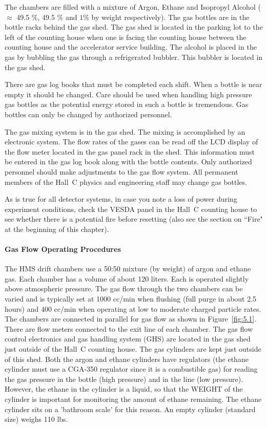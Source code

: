 The chambers are filled with a mixture of Argon, Ethane and Isopropyl Alcohol
($\approx$ 49.5 $\%$, 49.5 $\%$  and $1\%$ by weight respectively).
The gas bottles are in the bottle racks behind the gas shed. The gas shed
is located in the parking lot to the left of the counting house when one is facing the counting
house between the counting house and the accelerator
service building.  The alcohol is placed in the gas
by bubbling the gas through a refrigerated bubbler. This bubbler is
located in the gas shed.

There are gas log books that must be completed each shift.
When a bottle is near empty it should be changed.
Care should be used when handling high pressure gas bottles as the
potential energy stored in such a bottle is tremendous.
Gas bottles can only be changed by authorized personnel.

The gas mixing system is in the gas shed. The mixing is accomplished
by an electronic system. The flow rates of the gases can be read off the
LCD display of the flow meter located in the gas panel rack in the shed.
This information must be entered in the gas log book along with the bottle contents.
Only authorized personnel should make adjustments to the gas flow system.
All permanent members
of the Hall~C physics and engineering staff may change gas bottles.

As is true for all detector systems, in case you note a loss of power
during experiment conditions, check the VESDA panel in the Hall~C counting
house to see whether there is a potential fire before resetting (also
see the section on ``Fire" at the beginning of this chapter).

\paragraph {Gas Flow Operating Procedures}

The HMS drift chambers use a 50:50 mixture (by weight) of argon and
ethane gas.  Each chamber has a volume of about 120 liters.  Each is
operated slightly above atmospheric pressure.  The gas flow through
the two chambers can be varied and is typically set at 1000 cc/min
when flushing (full purge in about 2.5 hours) and 400 cc/min when operating
at low to moderate charged particle rates.  The chambers are connected
in parallel for gas flow as shown in Figure~\ref{fig:5.1}.  There are flow meters 
connected
to the exit line of each chamber.  The gas flow control electronics
and gas handling system (GHS) are located in the gas shed just outside
of the Hall~C counting house.  The gas cylinders are kept just outside of
this shed.  Both the argon and ethane cylinders have regulators (the ethane
cylinder must use a CGA-350 regulator since it is a combustible gas) for
reading the gas pressure in the bottle (high pressure) and in the line (low
pressure).  However, the ethane
in the cylinder is a liquid, so that the WEIGHT of the cylinder is important
for monitoring the amount of ethane remaining.  The ethane
cylinder sits on a 'bathroom scale' for this reason.  An empty cylinder
(standard size) weighs 110 lbs.

